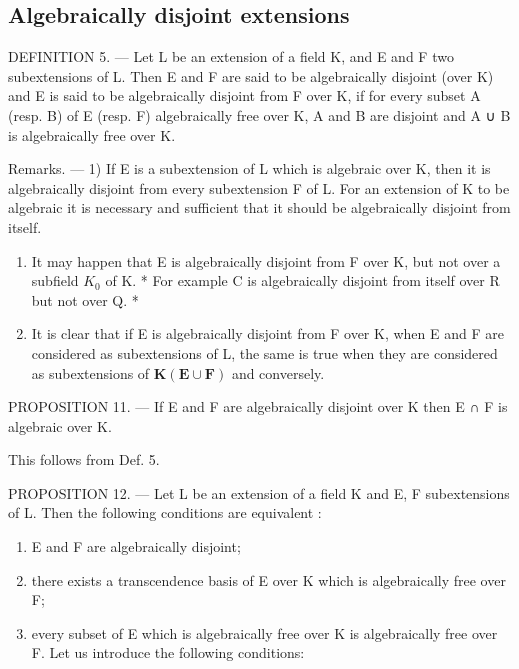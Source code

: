 \subsection{Algebraically disjoint extensions}

DEFINITION 5. --- Let L be an extension of a field K, and E and F two subextensions of L. Then E and F are said to be algebraically disjoint (over K) and E is said to be algebraically disjoint from F over K, if for every subset A (resp. B) of E (resp. F) algebraically free over K, A and B are disjoint and A ∪ B is algebraically free over K.

Remarks. --- 1) If E is a subextension of L which is algebraic over K, then it is algebraically disjoint from every subextension F of L. For an extension of K to be algebraic it is necessary and sufficient that it should be algebraically disjoint from itself.

\begin{enumerate}
\def\labelenumi{\arabic{enumi})}
\setcounter{enumi}{1}
\item
  It may happen that E is algebraically disjoint from F over K, but not over a subfield \(K_{0}\) of K. * For example C is algebraically disjoint from itself over R but not over Q. *
\item
  It is clear that if E is algebraically disjoint from F over K, when E and F are considered as subextensions of L, the same is true when they are considered as subextensions of \(\mathbf{K}(\mathbf{E} \cup \mathbf{F})\) and conversely.
\end{enumerate}

PROPOSITION 11. --- If E and F are algebraically disjoint over K then E ∩ F is algebraic over K.

This follows from Def. 5.

PROPOSITION 12. --- Let L be an extension of a field K and E, F subextensions of L. Then the following conditions are equivalent :

\begin{enumerate}
\def\labelenumi{\alph{enumi})}
\item
  E and F are algebraically disjoint;
\item
  there exists a transcendence basis of E over K which is algebraically free over F;
\item
  every subset of E which is algebraically free over K is algebraically free over F. Let us introduce the following conditions:
\end{enumerate}

